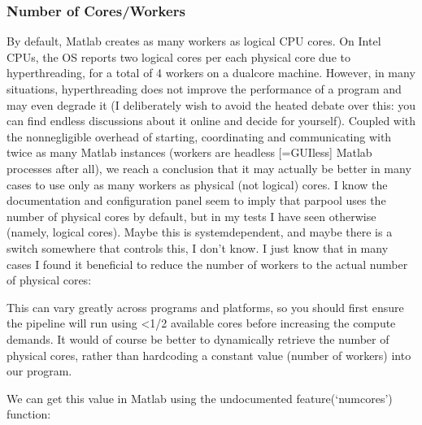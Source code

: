 \documentclass[letterpaper,10pt,english]{sphinxmanual}
\begin{document}
\subsubsection{Number of Cores/Workers}
\label{\detokenize{user_guide/tips_tricks:number-of-cores-workers}}
\sphinxAtStartPar
By default, Matlab creates as many workers as logical CPU cores. On Intel CPUs, the OS reports two logical cores per each physical core due to hyper\sphinxhyphen{}threading, for a total of 4 workers on a dual\sphinxhyphen{}core machine. However, in many situations, hyperthreading does not improve the performance of a program and may even degrade it (I deliberately wish to avoid the heated debate over this: you can find endless discussions about it online and decide for yourself). Coupled with the non\sphinxhyphen{}negligible overhead of starting, coordinating and communicating with twice as many Matlab instances (workers are headless {[}=GUI\sphinxhyphen{}less{]} Matlab processes after all), we reach a conclusion that it may actually be better in many cases to use only as many workers as physical (not logical) cores.
I know the documentation and configuration panel seem to imply that parpool uses the number of physical cores by default, but in my tests I have seen otherwise (namely, logical cores). Maybe this is system\sphinxhyphen{}dependent, and maybe there is a switch somewhere that controls this, I don’t know. I just know that in many cases I found it beneficial to reduce the number of workers to the actual number of physical cores:

\begin{sphinxVerbatim}[commandchars=\\\{\}]
\end{sphinxVerbatim}

\sphinxAtStartPar
This can vary greatly across programs and platforms, so you should first ensure the pipeline will run using \textless{}1/2 available cores before increasing the compute demands.
It would of course be better to dynamically retrieve the number of physical cores, rather than hard\sphinxhyphen{}coding a constant value (number of workers) into our program.

\sphinxAtStartPar
We can get this value in Matlab using the undocumented feature(‘numcores’) function:
\end{document}
